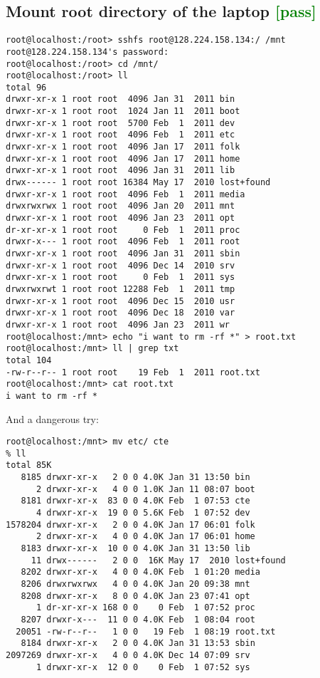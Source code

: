 \documentclass[a4paper]{report}
\begin{document}
\begin{enumerate}
\subsection{Mount root directory of the laptop \textcolor{green}{[pass]}}
\begin{lstlisting}
root@localhost:/root> sshfs root@128.224.158.134:/ /mnt             
root@128.224.158.134's password: 
root@localhost:/root> cd /mnt/
root@localhost:/root> ll
total 96
drwxr-xr-x 1 root root  4096 Jan 31  2011 bin
drwxr-xr-x 1 root root  1024 Jan 11  2011 boot
drwxr-xr-x 1 root root  5700 Feb  1  2011 dev
drwxr-xr-x 1 root root  4096 Feb  1  2011 etc
drwxr-xr-x 1 root root  4096 Jan 17  2011 folk
drwxr-xr-x 1 root root  4096 Jan 17  2011 home
drwxr-xr-x 1 root root  4096 Jan 31  2011 lib
drwx------ 1 root root 16384 May 17  2010 lost+found
drwxr-xr-x 1 root root  4096 Feb  1  2011 media
drwxrwxrwx 1 root root  4096 Jan 20  2011 mnt
drwxr-xr-x 1 root root  4096 Jan 23  2011 opt
dr-xr-xr-x 1 root root     0 Feb  1  2011 proc
drwxr-x--- 1 root root  4096 Feb  1  2011 root
drwxr-xr-x 1 root root  4096 Jan 31  2011 sbin
drwxr-xr-x 1 root root  4096 Dec 14  2010 srv
drwxr-xr-x 1 root root     0 Feb  1  2011 sys
drwxrwxrwt 1 root root 12288 Feb  1  2011 tmp
drwxr-xr-x 1 root root  4096 Dec 15  2010 usr
drwxr-xr-x 1 root root  4096 Dec 18  2010 var
drwxr-xr-x 1 root root  4096 Jan 23  2011 wr
root@localhost:/mnt> echo "i want to rm -rf *" > root.txt
root@localhost:/mnt> ll | grep txt
total 104
-rw-r--r-- 1 root root    19 Feb  1  2011 root.txt
root@localhost:/mnt> cat root.txt 
i want to rm -rf *
\end{lstlisting}
And a dangerous try:
\begin{lstlisting}
root@localhost:/mnt> mv etc/ cte
% ll
total 85K
   8185 drwxr-xr-x   2 0 0 4.0K Jan 31 13:50 bin
      2 drwxr-xr-x   4 0 0 1.0K Jan 11 08:07 boot
   8181 drwxr-xr-x  83 0 0 4.0K Feb  1 07:53 cte
      4 drwxr-xr-x  19 0 0 5.6K Feb  1 07:52 dev
1578204 drwxr-xr-x   2 0 0 4.0K Jan 17 06:01 folk
      2 drwxr-xr-x   4 0 0 4.0K Jan 17 06:01 home
   8183 drwxr-xr-x  10 0 0 4.0K Jan 31 13:50 lib
     11 drwx------   2 0 0  16K May 17  2010 lost+found
   8202 drwxr-xr-x   4 0 0 4.0K Feb  1 01:20 media
   8206 drwxrwxrwx   4 0 0 4.0K Jan 20 09:38 mnt
   8208 drwxr-xr-x   8 0 0 4.0K Jan 23 07:41 opt
      1 dr-xr-xr-x 168 0 0    0 Feb  1 07:52 proc
   8207 drwxr-x---  11 0 0 4.0K Feb  1 08:04 root
  20051 -rw-r--r--   1 0 0   19 Feb  1 08:19 root.txt
   8184 drwxr-xr-x   2 0 0 4.0K Jan 31 13:53 sbin
2097269 drwxr-xr-x   4 0 0 4.0K Dec 14 07:09 srv
      1 drwxr-xr-x  12 0 0    0 Feb  1 07:52 sys

\end{lstlisting}
\end{enumerate}
\end{document}
